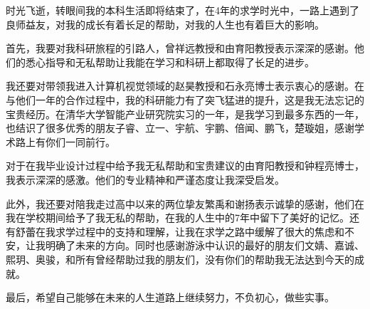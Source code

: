 %
%
%
%
%
%

\begin{acknowledgements}
时光飞逝，转眼间我的本科生活即将结束了，在4年的求学时光中，一路上遇到了良师益友，对我的成长有着长足的帮助，对我的人生也有着巨大的影响。

首先，我要对我科研旅程的引路人，曾祥远教授和由育阳教授表示深深的感谢。他们的悉心指导和无私帮助让我能在学习和科研上都取得了长足的进步。

我还要对带领我进入计算机视觉领域的赵昊教授和石永亮博士表示衷心的感谢。在与他们一年的合作过程中，我的科研能力有了突飞猛进的提升，这是我无法忘记的宝贵经历。在清华大学智能产业研究院实习的一年，是我学习到最多东西的一年，也结识了很多优秀的朋友子睿、立一、宇航、宇鹏、倍闻、鹏飞，楚璇姐，感谢学术路上有你们一同前行。

对于在我毕业设计过程中给予我无私帮助和宝贵建议的由育阳教授和钟程亮博士，我表示深深的感激。他们的专业精神和严谨态度让我深受启发。

此外，我还要对陪我走过高中以来的两位挚友繁禹和谢扬表示诚挚的感谢，他们在我在学校期间给予了我无私的帮助，在我的人生中的7年中留下了美好的记忆。还有舒蕾在我求学过程中的支持和理解，让我在求学之路中缓解了很大的焦虑和不安，让我明确了未来的方向。同时也感谢游泳中认识的最好的朋友们文婧、嘉诚、熙玥、奥骏，和所有曾经帮助过我的朋友们，没有你们的帮助我无法达到今天的成就。

最后，希望自己能够在未来的人生道路上继续努力，不负初心，做些实事。

\end{acknowledgements}

